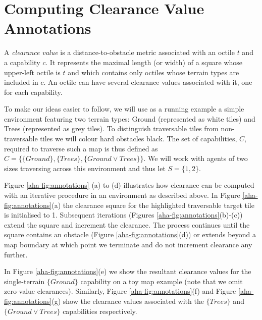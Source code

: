 \section{Computing Clearance Value Annotations}
\label{aha:planningwithannotations}
A \emph{clearance value} is a distance-to-obstacle metric associated with an octile $t$ and a capability $c$.
It represents the maximal length (or width) of a square whose upper-left octile is $t$ and which contains only octiles whose terrain types are included in $c$.
An octile can have several clearance values associated with it, one for each capability. 

To make our ideas easier to follow, we will use as a running example a simple environment featuring two terrain types: Ground (represented as white tiles) and Trees (represented as grey tiles). 
To distinguish traversable tiles from non-traversable tiles we will colour hard obstacles black. 
The set of capabilities, $C$, required to traverse such a map is thus defined as $C = \lbrace \lbrace \textit{Ground} \rbrace, \lbrace \textit{Trees} \rbrace, \lbrace \textit{Ground} \vee \textit{Trees} \rbrace \rbrace$. 
We will work with agents of two sizes traversing across this environment and thus let $S = \lbrace 1, 2 \rbrace$.
\par \indent
Figure \ref{aha-fig:annotations} (a) to (d) illustrates how clearance can be computed with an iterative procedure in an environment as described above.
In Figure \ref{aha-fig:annotations}(a) the clearance square for the highlighted traversable target tile is initialised to 1. 
Subsequent iterations (Figures \ref{aha-fig:annotations}(b)-(c)) extend the square and increment the clearance. 
The process continues until the square contains an obstacle (Figure \ref{aha-fig:annotations}(d)) or extends beyond a map boundary at which point we terminate and do not increment clearance any further.
\par \indent
In Figure \ref{aha-fig:annotations}(e) we show the resultant clearance values for the single-terrain $\lbrace \textit{Ground} \rbrace$ capability on a toy map example (note that we omit zero-value clearances).
Similarly, Figure \ref{aha-fig:annotations}(f) and Figure \ref{aha-fig:annotations}(g) show the clearance values associated with the $\lbrace \textit{Trees} \rbrace$ and $\lbrace \textit{Ground} \vee \textit{Trees} \rbrace$ capabilities respectively.  

